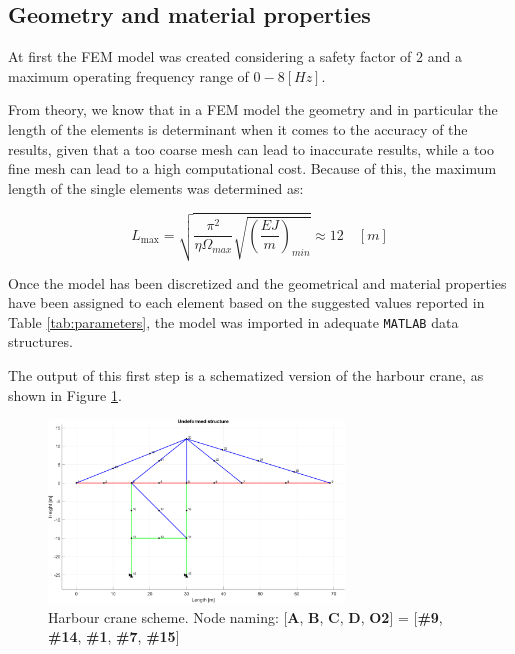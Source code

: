 \subsection{Geometry and material properties}
\label{sub:geometry_and_material_properties}

At first the FEM model was created considering a safety factor of $2$ and a maximum operating frequency range of $0-8 [Hz]$.

From theory, we know that in a FEM model the geometry and in particular the length of the elements is determinant when it comes to the accuracy of the results, given that a too coarse mesh can lead to inaccurate results, while a too fine mesh can lead to a high computational cost.
Because of this, the maximum length of the single elements was determined as:

\begin{equation}
    L_{\text{max}} = \sqrt{\frac{\pi^2}{\eta \Omega_{max}} \sqrt{\left(\frac{EJ}{m}\right)_{min}}} \approx 12 \quad [m]
\end{equation}

Once the model has been discretized and the geometrical and material properties have been assigned to each element based on the suggested values reported in Table \ref{tab:parameters}, the model was imported in adequate \texttt{MATLAB} data structures.

The output of this first step is a schematized version of the harbour crane, as shown in Figure \ref{fig:harbour-crane-scheme}.

\begin{figure}[H]
    \centering
    \includegraphics[width=0.7\textwidth]{img/MATLAB/undeformed-structure.png}
    \caption{Harbour crane scheme. Node naming: [\textbf{A}, \textbf{B}, \textbf{C}, \textbf{D}, \textbf{O2}] = [\textbf{\#9}, \textbf{\#14}, \textbf{\#1}, \textbf{\#7}, \textbf{\#15}]}
    \label{fig:harbour-crane-scheme}
\end{figure}

